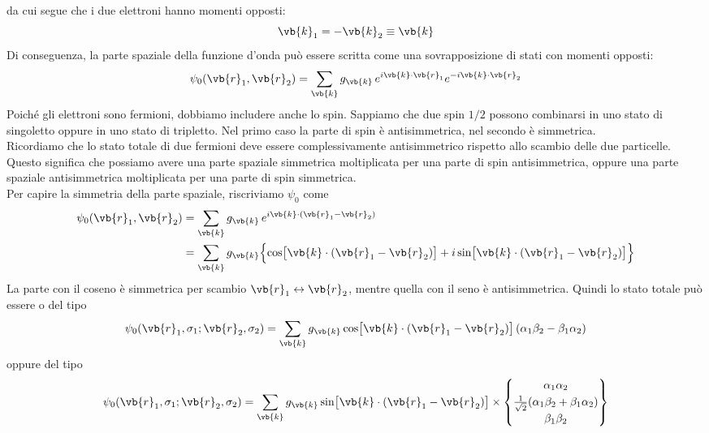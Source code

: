 da cui segue che i due elettroni hanno momenti opposti:
\begin{equation*}
   \vb{k}_1=-\vb{k}_2\equiv \vb{k}
\end{equation*}
Di conseguenza, la parte spaziale della funzione d'onda può essere scritta come una sovrapposizione di stati con momenti opposti:
\begin{equation*}
   \psi_0(\vb{r}_1,\vb{r}_2)
   =\sum_{\vb{k}} g_{\vb{k}}\, e^{i \vb{k}\cdot \vb{r}_1} e^{-i \vb{k}\cdot \vb{r}_2}
\end{equation*}
Poiché gli elettroni sono fermioni, dobbiamo includere anche lo spin. Sappiamo che due spin $1/2$ possono combinarsi in uno stato di singoletto oppure in uno stato di tripletto. Nel primo caso la parte di spin è antisimmetrica, nel secondo è simmetrica.\\
Ricordiamo che lo stato totale di due fermioni deve essere complessivamente antisimmetrico rispetto allo scambio delle due particelle. Questo significa che possiamo avere una parte spaziale simmetrica moltiplicata per una parte di spin antisimmetrica, oppure una parte spaziale antisimmetrica moltiplicata per una parte di spin simmetrica.\\
Per capire la simmetria della parte spaziale, riscriviamo $\psi_0$ come
\begin{equation*}
   \begin{split}
      \psi_0(\vb{r}_1,\vb{r}_2)
      &=\sum_{\vb{k}} g_{\vb{k}}\, e^{i\vb{k}\cdot(\vb{r}_1-\vb{r}_2)}
      \\
      &=\sum_{\vb{k}} g_{\vb{k}}
      \Bigl\{
      \cos\bigl[\vb{k}\cdot(\vb{r}_1-\vb{r}_2)\bigr]
      + i \sin\bigl[\vb{k}\cdot(\vb{r}_1-\vb{r}_2)\bigr]
      \Bigr\}
   \end{split}
\end{equation*}
La parte con il coseno è simmetrica per scambio $\vb{r}_1 \leftrightarrow \vb{r}_2$, mentre quella con il seno è antisimmetrica. Quindi lo stato totale può essere o del tipo
\begin{equation*}
   \psi_0(\vb{r}_1,\sigma_1;\vb{r}_2,\sigma_2)
   =\sum_{\vb{k}} g_{\vb{k}}
   \cos\bigl[\vb{k}\cdot(\vb{r}_1-\vb{r}_2)\bigr]
   \,(\alpha_1\beta_2-\beta_1\alpha_2)
\end{equation*}
oppure del tipo
\begin{equation*}
   \psi_0(\vb{r}_1,\sigma_1;\vb{r}_2,\sigma_2)
   =\sum_{\vb{k}} g_{\vb{k}}
   \sin\bigl[\vb{k}\cdot(\vb{r}_1-\vb{r}_2)\bigr]
   \times
   \begin{Bmatrix}
      \alpha_1\alpha_2\\[0.1cm]
      \frac{1}{\sqrt{2}}(\alpha_1\beta_2+\beta_1\alpha_2)\\[0.1cm]
      \beta_1\beta_2
   \end{Bmatrix}
\end{equation*}

